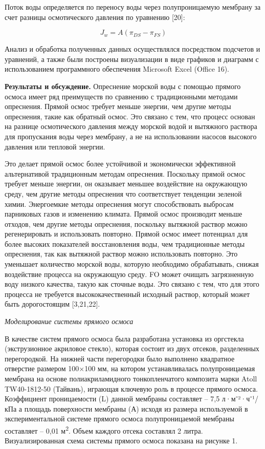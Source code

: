 \begin{multicols}{2}
Поток воды определяется по переносу воды через полупроницаемую мембрану
за счет разницы осмотического давления по уравнению {[}20{]}:

\begin{equation}
J_{w} = A(\pi_{DS} - \pi_{FS})
\end{equation}

Анализ и обработка полученных данных осуществлялся посредством подсчетов
и уравнений, а также были построены визуализации в виде графиков и
диаграмм с использованием программного обеспечения Microsoft Excel
(Office 16).

{\bfseries Результаты и обсуждение.} Опреснение морской воды с помощью
прямого осмоса имеет ряд преимуществ по сравнению с традиционными
методами опреснения. Прямой осмос требует меньше энергии, чем другие
методы опреснения, такие как обратный осмос. Это связано с тем, что
процесс основан на разнице осмотического давления между морской водой и
вытяжного раствора для пропускания воды через мембрану, а не на
использовании насосов высокого давления или тепловой энергии.

Это делает прямой осмос более устойчивой и экономически эффективной
альтернативой традиционным методам опреснения. Поскольку прямой осмос
требует меньше энергии, он оказывает меньшее воздействие на окружающую
среду, чем другие методы опреснения что соответствует тенденции зеленой
химии. Энергоемкие методы опреснения могут способствовать выбросам
парниковых газов и изменению климата. Прямой осмос производит меньше
отходов, чем другие методы опреснения, поскольку вытяжной раствор можно
регенерировать и использовать повторно. Прямой осмос имеет потенциал для
более высоких показателей восстановления воды, чем традиционные методы
опреснения, так как вытяжной раствор можно использовать повторно. Это
уменьшает количество морской воды, которую необходимо обрабатывать,
снижая воздействие процесса на окружающую среду. FO может очищать
загрязненную воду низкого качества, такую как сточные воды. Это связано
с тем, что для этого процесса не требуется высококачественный исходный
раствор, который может быть дорогостоящим {[}3,21,22{]}.

\emph{Моделирование системы прямого осмоса}

В качестве систем прямого осмоса была разработана установка из оргстекла
(экструзионное акриловое стекло), которая состоит из двух отсеков,
разделенных перегородкой. На нижней части перегородки было выполнено
квадратное отверстие размером 100×100 мм, на котором устанавливалась
полупроницаемая мембрана на основе полиакриламидного тонкопленчатого
композита марки Atoll TW40-1812-50 (Тайвань), играющая ключевую роль в
процессе прямого осмоса. Коэффициент проницаемости (L) данной мембраны
составляет -- 7,5 л·м⁻²·ч⁻¹/кПа а площадь поверхности мембраны (А)
исходя из размера используемой в экспериментальной системе прямого
осмоса полупроницаемой мембраны составляет -- 0,01 м\textsuperscript{2}.
Объем каждого отсека составлял 2 литра. Визуализированная схема системы
прямого осмоса показана на рисунке 1.
\end{multicols}

